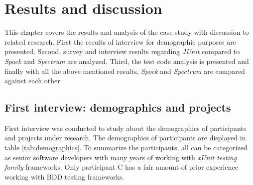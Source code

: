 \chapter{Results and discussion}
\label{chapter:results}

This chapter covers the results and analysis of the case study with discussion to related research.
First the results of interview for demographic purposes are
presented. Second, survey and interview results regarding \textit{JUnit} compared to \textit{Spock} and \textit{Spectrum} are analyzed.  Third, the test
code analysis is presented and finally
with all the above mentioned results, \textit{Spock} and \textit{Spectrum} are compared against each other.

\section{First interview: demographics and projects}
\label{section:demographics}
    First interview was conducted to study about the demographics of participants and projects under research.
    The demographics of participants are displayed in table \ref{tab:demographics}. To summarize the
    participants, all can be categorized as senior software developers with many years of working with \textit{xUnit testing family} frameworks.
    Only participant C has a fair amount of prior experience working with BDD testing frameworks.
